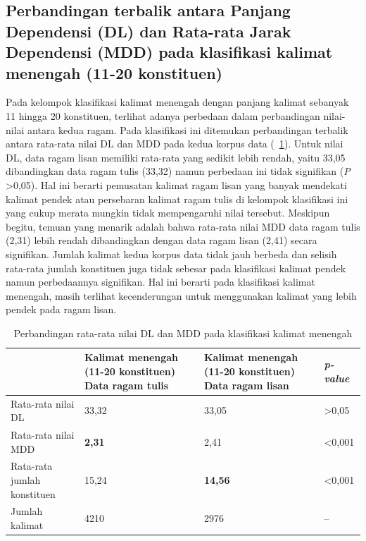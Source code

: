 \subsection{Perbandingan terbalik antara Panjang Dependensi (DL) dan Rata-rata Jarak Dependensi (MDD) pada klasifikasi kalimat menengah (11-20 konstituen)}
Pada kelompok klasifikasi kalimat menengah dengan panjang kalimat sebanyak 11 hingga 20 konstituen, terlihat adanya perbedaan dalam perbandingan nilai-nilai antara kedua ragam. Pada klasifikasi ini ditemukan perbandingan terbalik antara rata-rata nilai DL dan MDD pada kedua korpus data (\tab~\ref{tab:DL_MDD_menengah}). Untuk nilai DL, data ragam lisan memiliki rata-rata yang sedikit lebih rendah, yaitu 33,05 dibandingkan data ragam tulis (33,32) namun perbedaan ini tidak signifikan (\textit{P} \textgreater 0,05). Hal ini berarti pemusatan kalimat ragam lisan yang banyak mendekati kalimat pendek atau persebaran kalimat ragam tulis di kelompok klasifikasi ini yang cukup merata mungkin tidak mempengaruhi nilai tersebut. Meskipun begitu, temuan yang menarik adalah bahwa rata-rata nilai MDD data ragam tulis (2,31) lebih rendah dibandingkan dengan data ragam lisan (2,41) secara signifikan. Jumlah kalimat kedua korpus data tidak jauh berbeda dan selisih rata-rata jumlah konstituen juga tidak sebesar pada klasifikasi kalimat pendek namun perbedaannya signifikan. Hal ini berarti pada klasifikasi kalimat menengah, masih terlihat kecenderungan untuk menggunakan kalimat yang lebih pendek pada ragam lisan.  

\begin{table}
\begin{center}
\begin{small}
 \caption{Perbandingan rata-rata nilai DL dan MDD pada klasifikasi kalimat menengah}\label{tab:DL_MDD_menengah}  
 \begin{tabular}{| p{3.2cm} | p{3.2cm} | p{3.2cm} | p{2cm} |}
    \hline
 & Kalimat menengah \newline (11-20 konstituen) \newline Data ragam tulis & Kalimat menengah \newline (11-20 konstituen) \newline Data ragam lisan & \textit{p-value} \\ \hline
 Rata-rata nilai DL & 33,32 & 33,05 & \textgreater 0,05  \\ \hline
 Rata-rata nilai MDD & \textbf{2,31} & 2,41 & \textless 0,001 \\ \hline
 Rata-rata jumlah konstituen & 15,24 & \textbf{14,56} & \textless 0,001 \\ \hline
 Jumlah kalimat & 4210 & 2976 & -- \\ \hline
   \end{tabular}
   \end{small}
\end{center}
\end{table}


